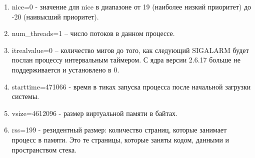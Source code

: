 \documentclass[a4paper,12pt]{article}
\begin{document}
\begin{enumerate}
		\item nice=0 - значение для nice в диапазоне от 19 (наиболее низкий приоритет) до -20 (наивысший приоритет).
		\item num\_threads=1 – число потоков в данном процессе.
		\item itrealvalue=0 – количество мигов до того, как следующий SIGALARM будет послан процессу интервальным таймером. С ядра версии 2.6.17 больше не поддерживается и установлено в 0.
		\item starttime=471066 - время в тиках запуска процесса после начальной загрузки системы.
		\item vsize=4612096 - размер виртуальной памяти в байтах.
		\item rss=199 - резидентный размер: количество страниц, которые занимает процесс в памяти. Это те страницы, которые заняты кодом, данными и пространством стека.
		

\end{enumerate}
\end{document}
